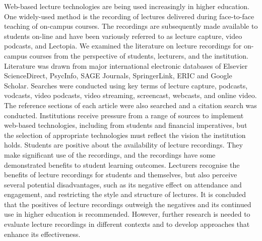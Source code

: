 Web-based lecture technologies are being used increasingly in higher education. One widely-used method is the recording of lectures delivered during face-to-face teaching of on-campus courses. The recordings are subsequently made available to students on-line and have been variously referred to as lecture capture, video podcasts, and Lectopia. We examined the literature on lecture recordings for on-campus courses from the perspective of students, lecturers, and the institution. Literature was drawn from major international electronic databases of Elsevier ScienceDirect, PsycInfo, SAGE Journals, SpringerLink, ERIC and Google Scholar. Searches were conducted using key terms of lecture capture, podcasts, vodcasts, video podcasts, video streaming, screencast, webcasts, and online video. The reference sections of each article were also searched and a citation search was conducted. Institutions receive pressure from a range of sources to implement web-based technologies, including from students and financial imperatives, but the selection of appropriate technologies must reflect the vision the institution holds. Students are positive about the availability of lecture recordings. They make significant use of the recordings, and the recordings have some demonstrated benefits to student learning outcomes. Lecturers recognise the benefits of lecture recordings for students and themselves, but also perceive several potential disadvantages, such as its negative effect on attendance and engagement, and restricting the style and structure of lectures. It is concluded that the positives of lecture recordings outweigh the negatives and its continued use in higher education is recommended. However, further research is needed to evaluate lecture recordings in different contexts and to develop approaches that enhance its effectiveness.\cite{OCallaghan2017}

